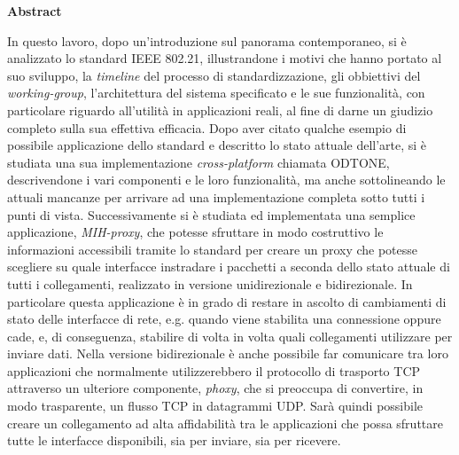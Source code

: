 \begin{center}
\LARGE{\textbf{Abstract}}
\end{center}
\vspace{3em}
In questo lavoro, dopo un'introduzione sul panorama contemporaneo, si è analizzato lo standard IEEE 802.21, illustrandone i motivi che hanno portato al suo sviluppo, la {\em timeline} del processo di standardizzazione, gli obbiettivi del {\em working-group}, l'architettura del sistema specificato e le sue funzionalità, con particolare riguardo all'utilità in applicazioni reali, al fine di darne un giudizio completo sulla sua effettiva efficacia. Dopo aver citato qualche esempio di possibile applicazione dello standard e descritto lo stato attuale dell'arte, si è studiata una sua implementazione {\em cross-platform} chiamata ODTONE, descrivendone i vari componenti e le loro funzionalità, ma anche sottolineando le attuali mancanze per arrivare ad una implementazione completa sotto tutti i punti di vista. Successivamente si è studiata ed implementata una semplice applicazione, {\em MIH-proxy}, che potesse sfruttare in modo costruttivo le informazioni accessibili tramite lo standard per creare un proxy che potesse scegliere su quale interfacce instradare i pacchetti a seconda dello stato attuale di tutti i collegamenti, realizzato in versione unidirezionale e bidirezionale. In particolare questa applicazione è in grado di restare in ascolto di cambiamenti di stato delle interfacce di rete, e.g. quando viene stabilita una connessione oppure cade, e, di conseguenza, stabilire di volta in volta quali collegamenti utilizzare per inviare dati. Nella versione bidirezionale è anche possibile far comunicare tra loro applicazioni che normalmente utilizzerebbero il protocollo di trasporto TCP attraverso un ulteriore componente, {\em phoxy}, che si preoccupa di convertire, in modo trasparente, un flusso TCP in datagrammi UDP. Sarà quindi possibile creare un collegamento ad alta affidabilità tra le applicazioni che possa sfruttare tutte le interfacce disponibili, sia per inviare, sia per ricevere.\cite{asd}